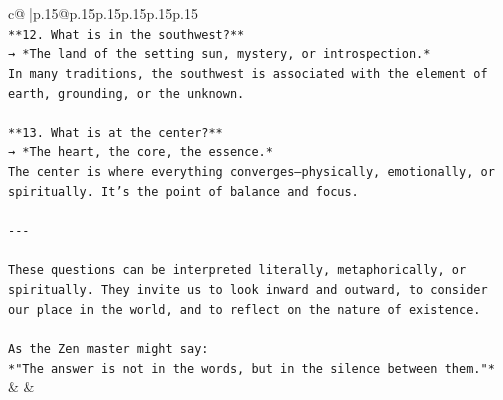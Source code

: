 \documentclass{article}
\begin{document}
{\begin{supertabular}{c@{$\;$}|p{.15\linewidth}@{}p{.15\linewidth}p{.15\linewidth}p{.15\linewidth}p{.15\linewidth}p{.15\linewidth}}
{{{\\ 
\texttt{**12. What is in the southwest?**  } \\
\texttt{→ *The land of the setting sun, mystery, or introspection.*  } \\
\texttt{In many traditions, the southwest is associated with the element of earth, grounding, or the unknown.} \\
\\ 
\texttt{**13. What is at the center?**  } \\
\texttt{→ *The heart, the core, the essence.*  } \\
\texttt{The center is where everything converges—physically, emotionally, or spiritually. It’s the point of balance and focus.} \\
\\ 
\texttt{{-}{-}{-}} \\
\\ 
\texttt{These questions can be interpreted literally, metaphorically, or spiritually. They invite us to look inward and outward, to consider our place in the world, and to reflect on the nature of existence.} \\
\\ 
\texttt{As the Zen master might say:  } \\
\texttt{*"The answer is not in the words, but in the silence between them."*} \\
            }
        }
    }
    & & \\ \\


\end{supertabular}}
\end{document}
